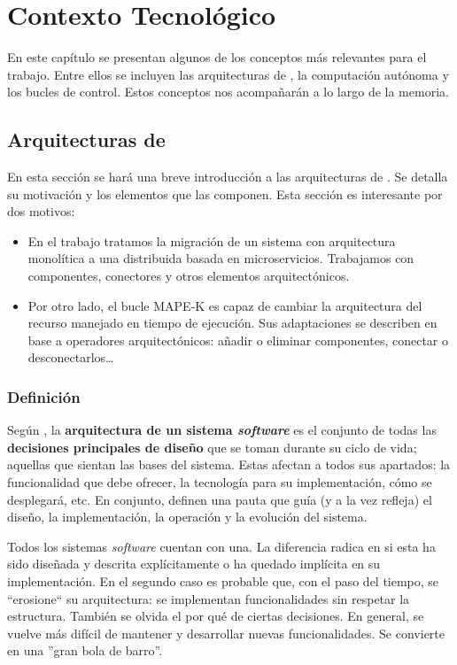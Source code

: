 \chapter{Contexto Tecnológico}
\label{chap:contexto_tecnologico}

En este capítulo se presentan algunos de los conceptos más relevantes para el trabajo. Entre ellos se incluyen las arquitecturas de , la computación autónoma y los bucles de control. Estos conceptos nos acompañarán a lo largo de la memoria.

\section{Arquitecturas de }

En esta sección se hará una breve introducción a las arquitecturas de . Se detalla su motivación y los elementos que las componen. Esta sección es interesante por dos motivos:

\begin{itemize}
  \item En el trabajo tratamos la migración de un sistema con arquitectura monolítica a una distribuida basada en microservicios. Trabajamos con componentes, conectores y otros elementos arquitectónicos.

  \item Por otro lado, el bucle MAPE-K es capaz de cambiar la arquitectura del recurso manejado en tiempo de ejecución. Sus adaptaciones se describen en base a operadores arquitectónicos: añadir o eliminar componentes, conectar o desconectarlos\dots
\end{itemize}

\subsection{Definición}

Según \cite{taylorSoftwareArchitectureFoundations2009}, la \textbf{arquitectura de un sistema \emph{software}} es el conjunto de todas las \textbf{decisiones principales de diseño} que se toman durante su ciclo de vida; aquellas que sientan las bases del sistema. Estas afectan a todos sus apartados: la funcionalidad que debe ofrecer, la tecnología para su implementación, cómo se desplegará, etc. En conjunto, definen una pauta que guía (y a la vez refleja) el diseño, la implementación, la operación y la evolución del sistema.

Todos los sistemas \emph{software} cuentan con una. La diferencia radica en si esta ha sido diseñada y descrita explícitamente o ha quedado implícita en su implementación. \cite{taylorSoftwareArchitectureFoundations2009} En el segundo caso es probable que, con el paso del tiempo, se ``erosione`` su arquitectura: se implementan funcionalidades sin respetar la estructura. También se olvida el por qué de ciertas decisiones. En general, se vuelve más difícil de mantener y desarrollar nuevas funcionalidades. Se convierte en una ''gran bola de barro''. \cite{footeBigBallMud1997}

